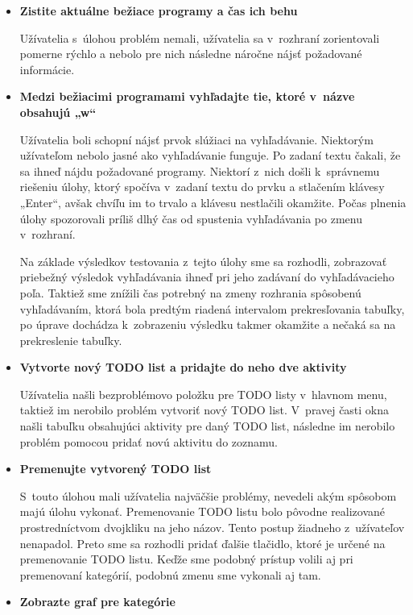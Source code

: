 \documentclass[]{article}
\begin{document}
\begin{itemize}
	\item \textbf{Zistite aktuálne bežiace programy a čas ich behu}
	
	 Užívatelia s~úlohou problém nemali, užívatelia sa v~rozhraní zorientovali pomerne rýchlo a nebolo pre nich následne náročne nájsť požadované informácie.
	
	\item \textbf{Medzi bežiacimi programami vyhľadajte tie, ktoré v~názve obsahujú „w“}
	
	Užívatelia boli schopní nájsť prvok slúžiaci na vyhľadávanie. Niektorým užívateľom nebolo jasné ako vyhľadávanie funguje. Po zadaní textu čakali, že sa ihneď nájdu požadované programy. Niektorí z~nich došli k~správnemu riešeniu úlohy, ktorý spočíva v~zadaní textu do prvku a stlačením klávesy „Enter“, avšak chvíľu im to trvalo a klávesu nestlačili okamžite. Počas plnenia úlohy spozorovali príliš dlhý čas od spustenia vyhľadávania po zmenu v~rozhraní.
	
	Na základe výsledkov testovania z~tejto úlohy sme sa rozhodli, zobrazovať priebežný výsledok vyhľadávania ihneď pri jeho zadávaní do vyhľadávacieho poľa. Taktiež sme znížili čas potrebný na zmeny rozhrania spôsobenú vyhľadávaním, ktorá bola predtým riadená intervalom prekresľovania tabuľky, po úprave dochádza k~zobrazeniu výsledku takmer okamžite a nečaká sa na prekreslenie tabuľky.
	
	\item \textbf{Vytvorte nový TODO list a pridajte do neho dve aktivity}
	
	Užívatelia našli bezproblémovo položku pre TODO listy v~hlavnom menu, taktiež im nerobilo problém vytvoriť nový TODO list. V~pravej časti okna našli tabuľku obsahujúci aktivity pre daný TODO list, následne im nerobilo problém pomocou pridať novú aktivitu do zoznamu.
	
	\item \textbf{Premenujte vytvorený TODO list}
	
	S~touto úlohou mali užívatelia najväčšie problémy, nevedeli akým spôsobom majú úlohu vykonať. Premenovanie TODO listu bolo pôvodne realizované prostredníctvom dvojkliku na jeho názov. Tento postup žiadneho z~užívateľov nenapadol. Preto sme sa rozhodli pridať ďalšie tlačidlo, ktoré je určené na premenovanie TODO listu. Keďže sme podobný prístup volili aj pri premenovaní kategórií, podobnú zmenu sme vykonali aj tam.
	
	\item \textbf{Zobrazte graf pre kategórie}
	

\end{itemize}
\end{document}
